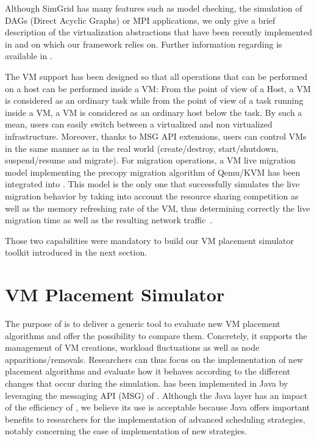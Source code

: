 Although SimGrid has many features such as model checking, the
simulation of DAGs (Direct Acyclic Graphs) or MPI applications, we
only give a brief description of the  virtualization  abstractions
that have been recently implemented in \sg and on which our framework relies
on.  Further information regarding \sg is available in \cite{casanova:hal-01017319}.

The VM support has been designed so that all operations that can be performed
on a host can be performed inside a VM: From the point of view of a \sg
Host, a \sg VM is considered as an ordinary task while from the point
of view of a task running inside a \sg VM, a VM is considered as an
ordinary host below the task.  By such a mean, \sg users can easily
switch between a virtualized and non virtualized infrastructure.
Moreover, thanks to  MSG API extensions, users can control VMs in the
same manner as in the real world (\eg create/destroy, start/shutdown,
suspend/resume and migrate).
For migration operations, a VM live migration model implementing the
precopy migration algorithm of Qemu/KVM has been integrated into \sg.
This model is the only one that successfully simulates the live
migration behavior by taking into account the resource sharing
competition as well as the memory refreshing rate of the VM, thus
determining correctly the live migration time as well as the resulting
network traffic~\cite{Hirofuchi:2013:ALM:2568486.2568524}.


Those two capabilities were mandatory to build our VM placement
simulator toolkit introduced in the next section.

\section{VM Placement Simulator}
\label{sec:injector}

The purpose of \vmps is to deliver a generic tool to evaluate new VM
placement algorithms and offer the possibility to compare
them. Concretely, it supports the management of VM creations, workload
fluctuations as well as node apparitions/removals.  Researchers can
thus focus on the implementation of new placement algorithms and
evaluate how it behaves according to the different changes that occur
during the simulation.
%
\vmps has been implemented in Java by leveraging the messaging API
(MSG) of \sg.  Although the Java layer has an impact of the efficiency
of \sg, we believe its use is acceptable because Java offers important
benefits to researchers for the implementation of advanced scheduling
strategies, notably concerning the ease of implementation of new
strategies.

